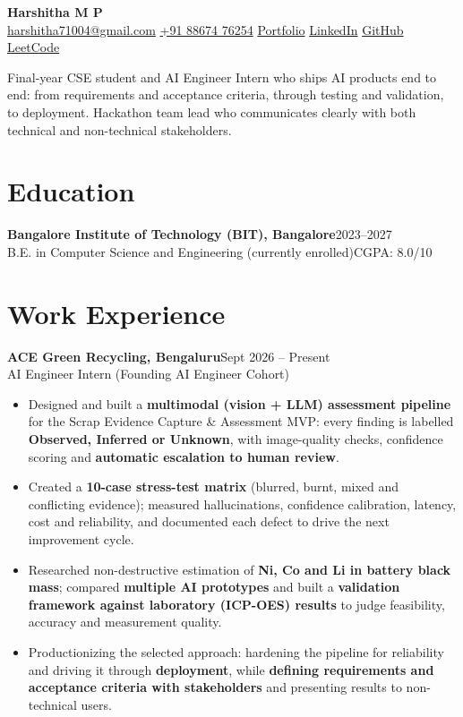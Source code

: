 \documentclass[letterpaper,10pt]{article}
\newcommand{\entry}[4]{%
  \vspace{2pt}\noindent\textbf{#1}\hfill #2\\
  #3\hfill #4\par\vspace{-1pt}}
\begin{document}
\begin{center}
  {\LARGE\bfseries Harshitha M P}\\[4pt]
  \small
  \href{mailto:harshitha71004@gmail.com}{harshitha71004@gmail.com}\quad
  \href{tel:+918867476254}{+91 88674 76254}\quad
  \href{https://harshitha7104.github.io/PORTFOLIO/}{Portfolio}\quad
  \href{https://www.linkedin.com/in/harshitha-m-p-81b734262/}{LinkedIn}\quad
  \href{https://github.com/harshitha7104}{GitHub}\quad
  \href{https://leetcode.com/u/harshitha056/}{LeetCode}
\end{center}

\vspace{-4pt}
\noindent\small Final-year CSE student and AI Engineer Intern who ships AI products end to end: from requirements and acceptance criteria, through testing and validation, to deployment. Hackathon team lead who communicates clearly with both technical and non-technical stakeholders.

\section{Education}
\entry{Bangalore Institute of Technology (BIT), Bangalore}{2023--2027}{B.E. in Computer Science and Engineering (currently enrolled)}{CGPA: 8.0/10}

\section{Work Experience}

\entry{ACE Green Recycling, Bengaluru}{Sept 2026 -- Present}{AI Engineer Intern (Founding AI Engineer Cohort)}{}
\begin{itemize}
  \small
  \item Designed and built a \textbf{multimodal (vision + LLM) assessment pipeline} for the Scrap Evidence Capture \& Assessment MVP: every finding is labelled \textbf{Observed, Inferred or Unknown}, with image-quality checks, confidence scoring and \textbf{automatic escalation to human review}.
  \item Created a \textbf{10-case stress-test matrix} (blurred, burnt, mixed and conflicting evidence); measured hallucinations, confidence calibration, latency, cost and reliability, and documented each defect to drive the next improvement cycle.
  \item Researched non-destructive estimation of \textbf{Ni, Co and Li in battery black mass}; compared \textbf{multiple AI prototypes} and built a \textbf{validation framework against laboratory (ICP-OES) results} to judge feasibility, accuracy and measurement quality.
  \item Productionizing the selected approach: hardening the pipeline for reliability and driving it through \textbf{deployment}, while \textbf{defining requirements and acceptance criteria with stakeholders} and presenting results to non-technical users.
\end{itemize}
\end{document}
